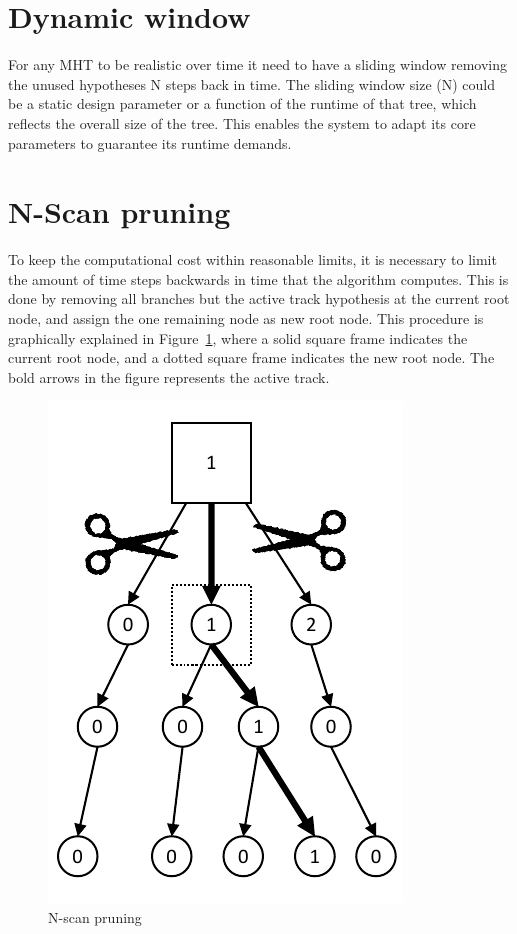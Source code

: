 \section{Dynamic window}
For any MHT to be realistic over time it need to have a sliding window removing the unused hypotheses N steps back in time. The sliding window size (N) could be a static design parameter or a function of the runtime of that tree, which reflects the overall size of the tree. This enables the system to adapt its core parameters to guarantee its runtime demands.

\section{N-Scan pruning}
To keep the computational cost within reasonable limits, it is necessary to limit the amount of time steps backwards in time that the algorithm computes. This is done by removing all branches but the active track hypothesis at the current root node, and assign the one remaining node as new root node. This procedure is graphically explained in Figure~\ref{fig:pruned_tree}, where a solid square frame indicates the current root node, and a dotted square frame indicates the new root node. The bold arrows in the figure represents the active track.
\begin{figure}
\centering
\includegraphics[scale = .8]{Figures/Pruned-tree.pdf}
\caption{N-scan pruning}\label{fig:pruned_tree}
\end{figure}

